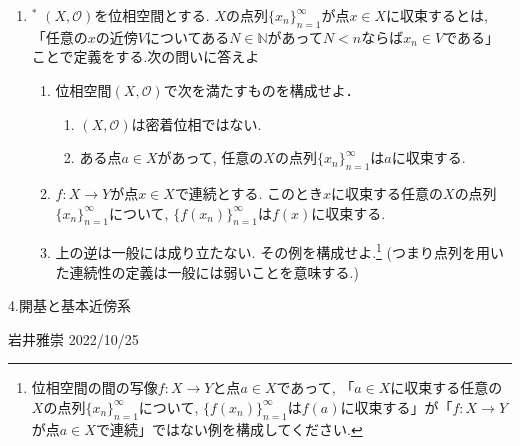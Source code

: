 \documentclass[dvipdfmx,a4paper,11pt]{article}
\newcommand{\N}{\mathbb{N}}
\theoremstyle{definition}
\begin{document}
\begin{enumerate}[ label=\textbf{問}3.\arabic*]
	
\item $^*$  $(X, \mathscr{O})$を位相空間とする.
$X$の点列$\{ x_n\}_{n =1}^{\infty}$が点$x\in X$に収束するとは, 「任意の$x$の近傍$V$についてある$N \in \N$があって$N<n$ならば$x_n \in V$である」ことで定義をする.次の問いに答えよ
 	\begin{enumerate}
	\item 位相空間$(X, \mathscr{O})$で次を満たすものを構成せよ．
		\begin{enumerate}
		\item $(X, \mathscr{O})$は密着位相ではない.
		\item ある点$a \in X$があって, 任意の$X$の点列$\{ x_n\}_{n =1}^{\infty}$は$a$に収束する.
		\end{enumerate}
	\item $f :X\rightarrow Y$が点$x\in X$で連続とする. このとき$x$に収束する任意の$X$の点列$\{ x_n\}_{n =1}^{\infty}$について, $\{ f(x_n)\}_{n =1}^{\infty}$は$f(x)$に収束する.
	\item 上の逆は一般には成り立たない. その例を構成せよ.\footnote{位相空間の間の写像$f :X\rightarrow Y$と点$a \in X$であって, 「$a \in X$に収束する任意の$X$の点列$\{ x_n\}_{n =1}^{\infty}$について, $\{ f(x_n)\}_{n =1}^{\infty}$は$f(a)$に収束する」が「$f :X\rightarrow Y$が点$a\in X$で連続」ではない例を構成してください.}
	(つまり点列を用いた連続性の定義は一般には弱いことを意味する.)
	\end{enumerate}
 \end{enumerate}


\newpage


\begin{center}
{\Large 4.開基と基本近傍系}
\end{center}

\begin{flushright}
 岩井雅崇 2022/10/25
\end{flushright}
\end{document}
